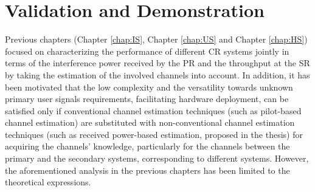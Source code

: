 \chapter{Validation and Demonstration}
\label{chap:HVD}

Previous chapters (Chapter \ref{chap:IS}, Chapter \ref{chap:US} and Chapter \ref{chap:HS}) focused on characterizing the performance of different CR systems jointly in terms of the interference power received by the PR and the throughput at the SR by taking the estimation of the involved channels into account. In addition, it has been motivated that the low complexity and the versatility towards unknown primary user signals requirements, facilitating hardware deployment, can be satisfied only if conventional channel estimation techniques (such as pilot-based channel estimation) are substituted with non-conventional channel estimation techniques (such as received power-based estimation, proposed in the thesis) for acquiring the channels' knowledge, particularly for the channels between the primary and the secondary systems, corresponding to different systems. However, the aforementioned analysis in the previous chapters has been limited to the theoretical expressions. 


